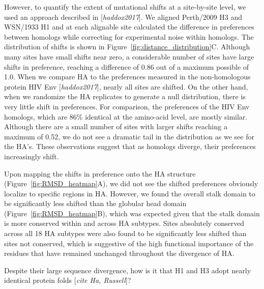 \documentclass[9pt,twocolumn,twoside]{pnas-new}
\newcommand{\comment}[1]{{\color{red}[\textsl{#1}]}}
\begin{document}
However, to quantify the extent of mutational shifts at a site-by-site level, we used an approach described in \comment{haddox2017}.
We aligned Perth/2009 H3 and WSN/1933 H1 and at each alignable site calculated the difference in preferences between homologs while correcting for experimental noise within homologs.
The distribution of shifts is shown in Figure~\ref{fig:distance_distribution}C.
Although many sites have small shifts near zero, a considerable number of sites have large shifts in preference, reaching a difference of 0.86 out of a maximum possible of 1.0.
When we compare HA to the preferences measured in the non-homologous protein HIV Env \comment{haddox2017}, nearly all sites are shifted.
On the other hand, when we randomize the HA replicates to generate a null distribution, there is very little shift in preferences. 
For comparison, the preferences of the HIV Env homologs, which are 86\% identical at the amino-acid level, are mostly similar. 
Although there are a small number of sites with larger shifts reaching a maximum of 0.52, we do not see a dramatic tail in the distribution as we see for the HA's.
These observations suggest that as homologs diverge, their preferences increasingly shift.

Upon mapping the shifts in preference onto the HA structure (Figure~\ref{fig:RMSD_heatmap}A), we did not see the shifted preferences obviously localize to specific regions in HA.
However, we found the overall stalk domain to be significantly less shifted than the globular head domain (Figure~\ref{fig:RMSD_heatmap}B), which was expected given that the stalk domain is more conserved within and across HA subtypes.
Sites absolutely conserved across all 18 HA subtypes were also found to be significantly less shifted than sites not conserved, which is suggestive of the high functional importance of the residues that have remained unchanged throughout the divergence of HA.

Despite their large sequence divergence, how is it that H1 and H3 adopt nearly identical protein folds \comment{cite Ha, Russell}?
\end{document}
